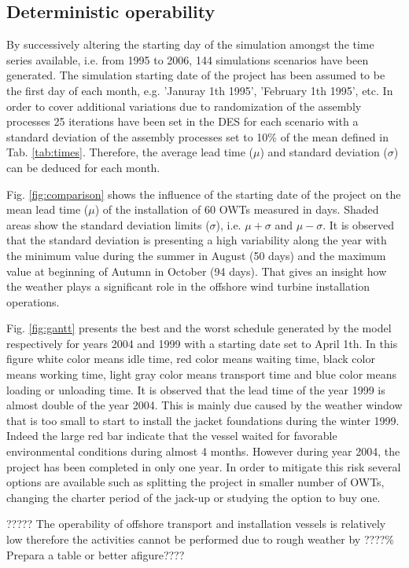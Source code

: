 \subsection{Deterministic operability}
By successively altering the starting day of the simulation amongst the time series available, i.e. from 1995 to 2006, 144 simulations scenarios have been generated. The simulation starting date of the project has been assumed to be the first day of each month, e.g. 'Januray 1th 1995', 'February 1th 1995', etc. In order to cover additional variations due to randomization of the assembly processes 25 iterations have been set in the DES for each scenario with a standard deviation of the assembly processes set to 10\% of the mean defined in Tab. \ref{tab:times}. Therefore, the average lead time ($\mu$) and standard deviation ($\sigma$) can be deduced for each month.

Fig. \ref{fig:comparison} shows the influence of the starting date of the project on the mean lead time ($\mu$) of the installation of 60 OWTs measured in days. Shaded areas show the standard deviation limits ($\sigma$), i.e. $\mu + \sigma$ and $\mu - \sigma$. It is observed that the standard deviation is presenting a high variability along the year with the minimum value during the summer in August (50 days) and the maximum value at beginning of Autumn in October (94 days). That gives an insight how the weather plays a significant role in the offshore wind turbine installation operations.

Fig. \ref{fig:gantt} presents the best and the worst schedule generated by the model respectively for years 2004 and 1999 with a starting date set to April 1th. In this figure white color means idle time, red color means waiting time, black color means working time, light gray color means transport time and blue color means loading or unloading time. It is observed that the lead time of the year 1999 is almost double of the year 2004. This is mainly due caused by the weather window that is too small to start to install the jacket foundations during the winter 1999. Indeed the large red bar indicate that the vessel waited for favorable environmental conditions during almost 4 months. However during year 2004, the project has been completed in only one year. In order to mitigate this risk several options are available such as splitting the project in smaller number of OWTs, changing the charter period of the jack-up or studying the option to buy one.

????? The operability of offshore transport and installation vessels is relatively low therefore the activities cannot be performed due to rough weather by ????\% Prepara a table or better afigure????